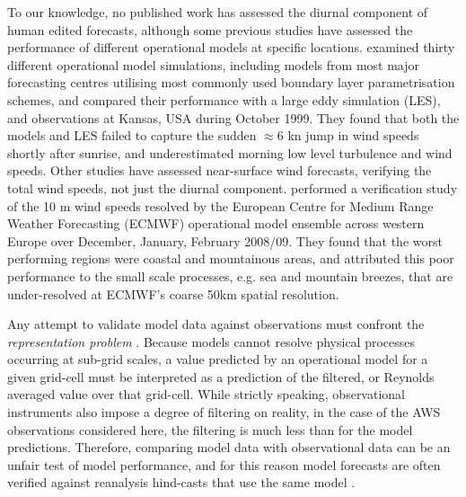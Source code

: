 \documentclass{ametsoc}
\begin{document}
To our knowledge, no published work has assessed the diurnal component of human edited forecasts, although some previous studies have assessed the performance of different operational models at specific locations. \citet{svensson11} examined thirty different operational model simulations, including models from most major forecasting centres utilising most commonly used boundary layer parametrisation schemes, and compared their performance with a large eddy simulation (LES), and observations at Kansas, USA during October 1999. They found that both the models and LES failed to capture the sudden $\approx 6$ kn jump in wind speeds shortly after sunrise, and underestimated morning low level turbulence and wind speeds. Other studies have assessed near-surface wind forecasts, verifying the total wind speeds, not just the diurnal component. \citet{pinson12} performed a verification study of the 10 m wind speeds resolved by the European Centre for Medium Range Weather Forecasting (ECMWF) operational model ensemble across western Europe over December, January, February 2008/09. They found that the worst performing regions were coastal and mountainous areas, and attributed this poor performance to the small scale processes, e.g. sea and mountain breezes, that are under-resolved at ECMWF's coarse 50km spatial resolution. 

Any attempt to validate model data against observations must confront the \textit{representation problem} \citep[e.g.][]{zaron06}. Because models cannot resolve physical processes occurring at sub-grid scales, a value predicted by an operational model for a given grid-cell must be interpreted as a prediction of the filtered, or Reynolds averaged value over that grid-cell. While strictly speaking, observational instruments also impose a degree of filtering on reality, in the case of the AWS observations considered here, the filtering is much less than for the model predictions. Therefore, comparing model data with observational data can be an unfair test of model performance, and for this reason model forecasts are often verified against reanalysis hind-casts that use the same model \citep[e.g.][]{lynch14}.
\end{document}
